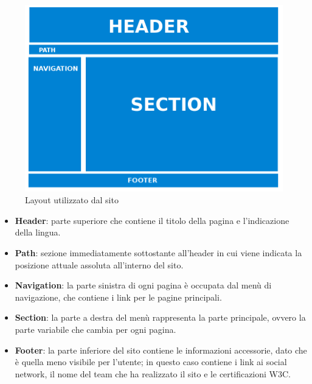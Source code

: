 \documentclass[10pt,a4paper,onecolumn]{article}
\begin{document}
\begin{figure}[h]
\centering
\includegraphics[scale=0.25]{layout}
\caption{Layout utilizzato dal sito}
\label{layoutPic}
\end{figure}

\begin{itemize}
 \item \textbf{Header}: parte superiore che contiene il titolo della pagina e l'indicazione della lingua.
 \item \textbf{Path}: sezione immediatamente sottostante all'header in cui viene indicata la posizione attuale assoluta all'interno del sito.
 \item \textbf{Navigation}: la parte sinistra di ogni pagina è occupata dal menù di navigazione, che contiene i link per le pagine principali.
 \item \textbf{Section}: la parte a destra del menù rappresenta la parte principale, ovvero la parte variabile che cambia per ogni pagina.
 \item \textbf{Footer}: la parte inferiore del sito contiene le informazioni accessorie, dato che è quella meno visibile per l'utente; in questo caso contiene i link ai social network, il nome del team che ha realizzato il sito e le certificazioni W3C.
\end{itemize}
\end{document}
